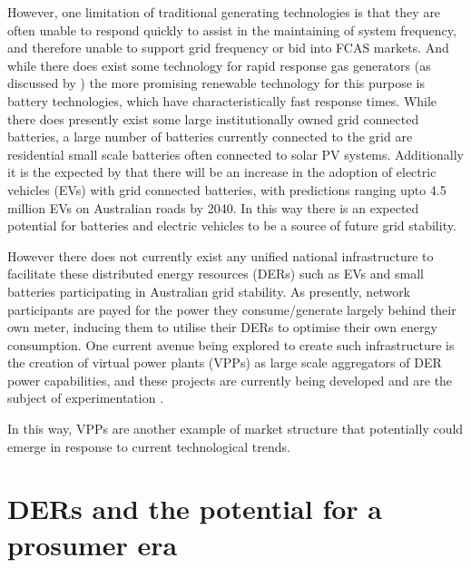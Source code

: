 However, one limitation of traditional generating technologies is that they are often unable to respond quickly to assist in the maintaining of system frequency, and therefore unable to support grid frequency or bid into FCAS markets.
And while there does exist some technology for rapid response gas generators (as discussed by \cite{GONZALEZSALAZAR20181497}) the more promising renewable technology for this purpose is battery technologies, which have characteristically fast response times.
While there does presently exist some large institutionally owned grid connected batteries, a large number of batteries currently connected to the grid are residential small scale batteries often connected to solar PV systems.
Additionally it is the expected by \cite{australianenergymarketoperatorlimited2019} that there will be an increase in the adoption of electric vehicles (EVs) with grid connected batteries, with predictions ranging upto 4.5 million EVs on Australian roads by 2040.
In this way there is an expected potential for batteries and electric vehicles to be a source of future grid stability.

However there does not currently exist any unified national infrastructure to facilitate these distributed energy resources (DERs) such as EVs and small batteries participating in Australian grid stability.
As presently, network participants are payed for the power they consume/generate largely behind their own meter, inducing them to utilise their DERs to optimise their own energy consumption.
One current avenue being explored to create such infrastructure is the creation of virtual power plants (VPPs) as large scale aggregators of DER power capabilities, and these projects are currently being developed and are the subject of experimentation \citep{australianenergymarketoperatorlimited20188}.


In this way, VPPs are another example of market structure that potentially could emerge in response to current technological trends.

\section{DERs and the potential for a prosumer era}


